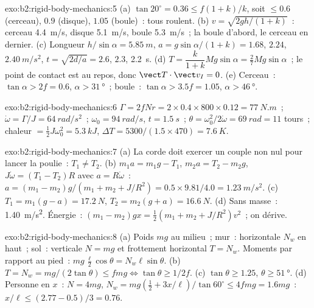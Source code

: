 \begin{solution}{exo:b2:rigid-body-mechanics:5}
(a) $\tan20^\circ = 0.36 \le f(1 + k)/k$, soit $\le 0.6$ (cerceau), $0.9$
(disque), $1.05$ (boule)~: tous roulent. (b) $v = \sqrt{2gh/(1 + k)}$~: cerceau
\qty{4.4}{m/s}, disque \qty{5.1}{m/s}, boule \qty{5.3}{m/s}~; la boule d'abord, le cerceau
en dernier. (c) Longueur $h/\sin\alpha = \qty{5.85}{m}$, $a = g\sin\alpha/(1 + k) =
1.68$, $2.24$, $\qty{2.40}{m/s^2}$, $t = \sqrt{2d/a} = 2.6$, $2.3$, \qty{2.2}{s}.
(d) $T = \dfrac{k}{1 + k}Mg\sin\alpha = \tfrac27Mg\sin\alpha$~; le point de contact
est au repos, donc $\vect T\cdot\vect v_I = 0$. (e) Cerceau~: $\tan\alpha >
2f = 0.6$, $\alpha > \qty{31}{\degree}$~; boule~: $\tan\alpha > 3.5f = 1.05$,
$\alpha > \qty{46}{\degree}$.
\end{solution}

\begin{solution}{exo:b2:rigid-body-mechanics:6}
$\Gamma = 2fNr = 2 \times 0.4 \times 800 \times 0.12 = \qty{77}{N.m}$~; $\dot\omega =
\Gamma/J = \qty{64}{rad/s^2}$~; $\omega_0 = \qty{94}{rad/s}$, $t = \qty{1.5}{s}$~;
$\theta = \omega_0^2/2\dot\omega = \qty{69}{rad} = 11$ tours~; chaleur $= \tfrac12J
\omega_0^2 = \qty{5.3}{kJ}$, $\Delta T = 5300/(1.5 \times 470) = \qty{7.6}{K}$.
\end{solution}

\begin{solution}{exo:b2:rigid-body-mechanics:7}
(a) La corde doit exercer un couple non nul pour lancer la poulie~: $T_1 \ne T_2$.
(b) $m_1a = m_1g - T_1$, $m_2a = T_2 - m_2g$, $J\dot\omega = (T_1 - T_2)R$ avec
$a = R\dot\omega$~: $a = (m_1 - m_2)g/(m_1 + m_2 + J/R^2) = 0.5 \times 9.81/4.0 =
\qty{1.23}{m/s^2}$. (c) $T_1 = m_1(g - a) = \qty{17.2}{N}$, $T_2 = m_2(g + a) =
\qty{16.6}{N}$. (d) Sans masse~: \qty{1.40}{m/s^2}. Énergie~: $(m_1 - m_2)gx =
\tfrac12(m_1 + m_2 + J/R^2)v^2$~; on dérive.
\end{solution}

\begin{solution}{exo:b2:rigid-body-mechanics:8}
(a) Poids $mg$ au milieu~; mur~: horizontale $N_w$ en haut~; sol~:
verticale $N = mg$ et frottement horizontal $T = N_w$. Moments par rapport au
pied~: $mg\,\tfrac{\ell}2\cos\theta = N_w\ell\sin\theta$. (b) $T = N_w =
mg/(2\tan\theta) \le fmg \iff \tan\theta \ge 1/2f$. (c) $\tan\theta \ge
1.25$, $\theta \ge \qty{51}{\degree}$. (d) Personne en $x$~: $N = 4mg$, $N_w =
mg(\tfrac12 + 3x/\ell)/\tan60^\circ \le 4fmg = 1.6mg$~: $x/\ell \le (2.77 -
0.5)/3 = 0.76$.
\end{solution}

